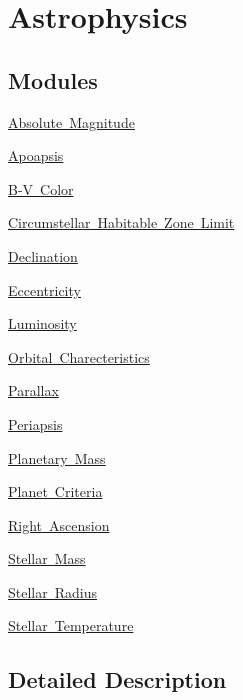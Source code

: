 \hypertarget{group___e_g_x_phys-_astrophysics}{}\section{Astrophysics}
\label{group___e_g_x_phys-_astrophysics}
\subsection*{Modules}
\begin{DoxyCompactItemize}
\item 
\mbox{\hyperlink{group___e_g_x_phys-_absolute_magnitude}{Absolute Magnitude}}
\item 
\mbox{\hyperlink{group___e_g_x_phys-_apoapsis}{Apoapsis}}
\item 
\mbox{\hyperlink{group___e_g_x_phys-_b_v_color}{B-\/\+V Color}}
\item 
\mbox{\hyperlink{group___e_g_x_phys-_circumstellar_habitable_zone_limit}{Circumstellar Habitable Zone Limit}}
\item 
\mbox{\hyperlink{group___e_g_x_phys-_astrophysics-_declination}{Declination}}
\item 
\mbox{\hyperlink{group___e_g_x_phys-_eccentricity}{Eccentricity}}
\item 
\mbox{\hyperlink{group___e_g_x_phys-_luminosity}{Luminosity}}
\item 
\mbox{\hyperlink{group___e_g_x_phys-_orbital_charecteristics}{Orbital Charecteristics}}
\item 
\mbox{\hyperlink{group___e_g_x_phys-_parallax}{Parallax}}
\item 
\mbox{\hyperlink{group___e_g_x_phys-_periapsis}{Periapsis}}
\item 
\mbox{\hyperlink{group___e_g_x_phys-_planetary_mass}{Planetary Mass}}
\item 
\mbox{\hyperlink{group___e_g_x_phys-_planet_criteria}{Planet Criteria}}
\item 
\mbox{\hyperlink{group___e_g_x_phys-_astrophysics-_right_ascension}{Right Ascension}}
\item 
\mbox{\hyperlink{group___e_g_x_phys-_stellar_mass}{Stellar Mass}}
\item 
\mbox{\hyperlink{group___e_g_x_phys-_stellar_radius}{Stellar Radius}}
\item 
\mbox{\hyperlink{group___e_g_x_phys-_stellar_temperature}{Stellar Temperature}}
\end{DoxyCompactItemize}


\subsection{Detailed Description}
